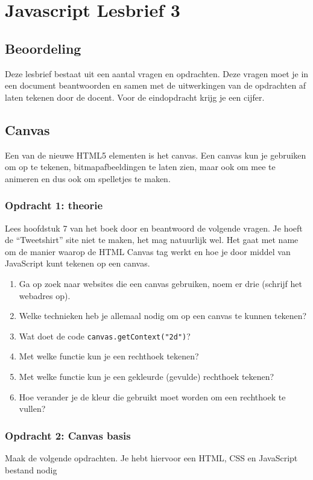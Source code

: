 \documentclass[a4paper]{report}
\begin{document}
\chapter*{\textcolor{seccol}{Javascript} Lesbrief 3}

\section*{Beoordeling}
Deze lesbrief bestaat uit een aantal vragen en opdrachten. Deze vragen moet je in een document beantwoorden en samen met de uitwerkingen van de opdrachten af laten tekenen door de docent. Voor de eindopdracht krijg je een cijfer.

\section*{Canvas}
Een van de nieuwe HTML5 elementen is het canvas. Een canvas kun je gebruiken om op te tekenen, bitmapafbeeldingen te laten zien, maar ook om mee te animeren en dus ook om spelletjes te maken.

\subsection*{Opdracht 1: theorie}
Lees hoofdstuk 7 van het boek door en beantwoord de volgende vragen. Je hoeft de ``Tweetshirt'' site niet te maken, het mag natuurlijk wel. Het gaat met name om de manier waarop de HTML Canvas tag werkt en hoe je door middel van JavaScript kunt tekenen op een canvas.

\begin{enumerate}
	\item Ga op zoek naar websites die een canvas gebruiken, noem er drie (schrijf het webadres op).
	\item Welke technieken heb je allemaal nodig om op een canvas te kunnen tekenen?
	\item Wat doet de code \texttt{canvas.getContext("2d")}?
	\item Met welke functie kun je een rechthoek tekenen?
	\item Met welke functie kun je een gekleurde (gevulde)  rechthoek tekenen?
	\item Hoe verander je de kleur die gebruikt moet worden om een rechthoek te vullen?
\end{enumerate}

\subsection*{Opdracht 2: Canvas basis}
Maak de volgende opdrachten. Je hebt hiervoor een HTML, CSS en JavaScript bestand nodig
\end{document}
